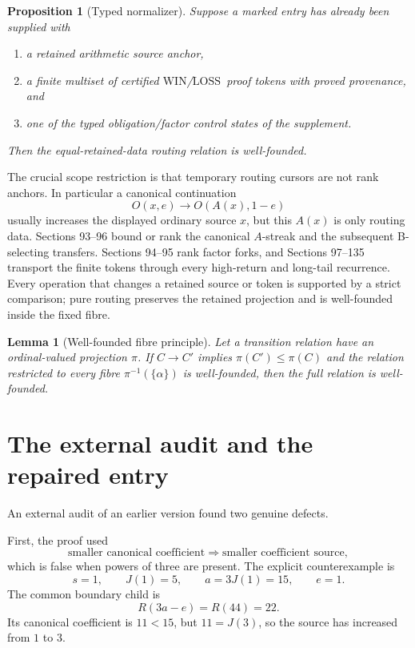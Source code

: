 \documentclass[11pt]{article}
\newtheorem{lemma}[theorem]{Lemma}
\newtheorem{proposition}[theorem]{Proposition}
\newcommand{\WIN}{\ensuremath{\mathrm{WIN}}}
\newcommand{\LOSS}{\ensuremath{\mathrm{LOSS}}}
\begin{document}
\begin{proposition}[Typed normalizer]\label{prop:typed-normalizer}
Suppose a marked entry has already been supplied with
\begin{enumerate}[label=(\roman*)]
\item a retained arithmetic source anchor,
\item a finite multiset of certified \WIN/\LOSS\ proof tokens with proved
      provenance, and
\item one of the typed obligation/factor control states of the supplement.
\end{enumerate}
Then the equal-retained-data routing relation is well-founded.
\end{proposition}

The crucial scope restriction is that temporary routing cursors are not rank
anchors. In particular a canonical continuation
\[
 O(x,e)\longrightarrow O(A(x),1-e)
\]
usually increases the displayed ordinary source $x$, but this $A(x)$ is only
routing data. Sections 93--96 bound or rank the canonical $A$-streak and the
subsequent B-selecting transfers. Sections 94--95 rank factor forks, and
Sections 97--135 transport the finite tokens through every high-return and
long-tail recurrence. Every operation that changes a retained source or token
is supported by a strict comparison; pure routing preserves the retained
projection and is well-founded inside the fixed fibre.

\begin{lemma}[Well-founded fibre principle]\label{lem:fibre}
Let a transition relation have an ordinal-valued projection $\pi$. If
$C\to C'$ implies $\pi(C')\le\pi(C)$ and the relation restricted to every
fibre $\pi^{-1}(\{\alpha\})$ is well-founded, then the full relation is
well-founded.
\end{lemma}

\section{The external audit and the repaired entry}\label{sec:audit}

An external audit of an earlier version found two genuine defects.

First, the proof used
\[
 \text{smaller canonical coefficient}
 \Longrightarrow
 \text{smaller coefficient source},
\]
which is false when powers of three are present. The explicit counterexample
is
\[
 s=1,\qquad J(1)=5,\qquad a=3J(1)=15,\qquad e=1.
\]
The common boundary child is
\[
 R(3a-e)=R(44)=22.
\]
Its canonical coefficient is $11<15$, but $11=J(3)$, so the source has
increased from $1$ to $3$.
\end{document}
